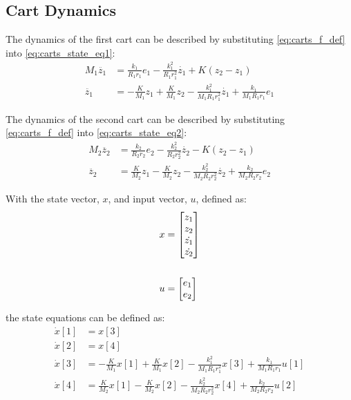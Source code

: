 \documentclass[]{article}
\begin{document}
		
	\subsection{Cart Dynamics}
		The dynamics of the first cart can be described by substituting \eqref{eq:carts_f_def} into \eqref{eq:carts_state_eq1}:
		\begin{align}
			M_1 \ddot{z_1} &= \frac{k_1}{R_1 r_1} e_1 - \frac{k_1^2}{R_1 r_1^2} \dot{z_1} + K(z_2 - z_1) \nonumber\\
			\ddot{z_1} &= -\frac{K}{M_1} z_1 + \frac{K}{M_1} z_2 - \frac{k_1^2}{M_1 R_1 r_1^2} \dot{z_1} + \frac{k_1}{M_1 R_1 r_1} e_1
		\end{align}
	
		The dynamics of the second cart can be described by substituting \eqref{eq:carts_f_def} into \eqref{eq:carts_state_eq2}:
		\begin{align}
			M_2 \ddot{z_2} &= \frac{k_2}{R_2 r_2} e_2 - \frac{k_2^2}{R_2 r_2^2} \dot{z_2} - K(z_2 - z_1) \nonumber\\
			\ddot{z_2} &= \frac{K}{M_2} z_1 - \frac{K}{M_2} z_2 - \frac{k_2^2}{M_2 R_2 r_2^2} \dot{z_2} + \frac{k_2}{M_2 R_2 r_2} e_2
		\end{align}
	
		With the state vector, $x$, and input vector, $u$, defined as:
		\begin{align}
			x &= \mqty[z_1\\ z_2\\ \dot{z_1}\\ \dot{z_2}] \label{eq:carts_x_def}\\
			\nonumber\\
			u &= \mqty[e_1\\ e_2] \label{eq:carts_u_def}
		\end{align}
		
		the state equations can be defined as:
		\begin{equation}\label{eq:carts_state_eqs}
			\begin{aligned}
				\dot{x}[1] &= x[3]\\
				\dot{x}[2] &= x[4]\\
				\dot{x}[3] &= -\frac{K}{M_1} x[1] + \frac{K}{M_1} x[2] - \frac{k_1^2}{M_1 R_1 r_1^2} x[3] + \frac{k_1}{M_1 R_1 r_1} u[1]\\
				\dot{x}[4] &= \frac{K}{M_2} x[1] - \frac{K}{M_2} x[2] - \frac{k_2^2}{M_2 R_2 r_2^2} x[4] + \frac{k_2}{M_2 R_2 r_2} u[2]
			\end{aligned}
		\end{equation}
\end{document}
